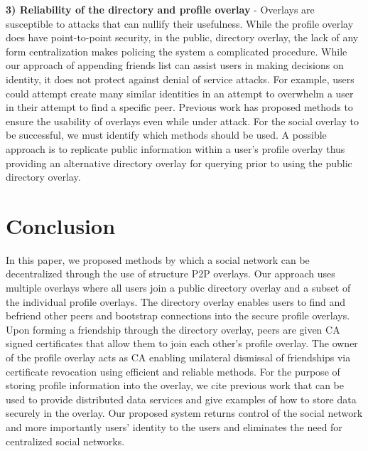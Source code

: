 \documentclass[letterpaper,twocolumn,10pt]{article}
\begin{document}
{\bf 3) Reliability of the directory and profile overlay} - Overlays are
susceptible to attacks that can nullify their usefulness.  While
the profile overlay does have point-to-point security, in the public,
directory overlay, the lack of any form centralization makes policing the system
a complicated procedure.  While our approach of appending friends list can assist
users in making decisions on identity, it does not protect against denial of
service attacks.  For example, users could attempt create many similar identities
in an attempt to overwhelm a user in their attempt to find a specific peer.
Previous work has proposed methods to ensure the usability of overlays even
while under attack.  For the social overlay to be successful, we must identify
which methods should be used. A possible approach is to replicate public
information within a user's profile overlay thus providing an alternative
directory overlay for querying prior to using the public directory overlay.

\section{Conclusion}
\label{conclusion}
In this paper, we proposed methods by which a social network can be
decentralized through the use of structure P2P overlays.  Our approach uses
multiple overlays where all users join a public directory overlay and a subset
of the individual profile overlays.  The directory overlay  enables
users to find and befriend other peers and bootstrap connections
into the secure profile overlays.  Upon forming a friendship through the
directory overlay, peers are given CA signed certificates that allow them to
join each other's profile overlay.  The owner of the profile overlay acts as
CA enabling unilateral dismissal of friendships via certificate revocation
using efficient and reliable methods.
For the purpose of storing profile information into the overlay, we cite
previous work that can be used to provide distributed data services and give
examples of how to store data securely in the overlay.  Our proposed system
returns control of the social network and more importantly users' identity to
the users and eliminates the need for centralized social networks.


\footnotesize{

\suppressfloats
}
\end{document}
